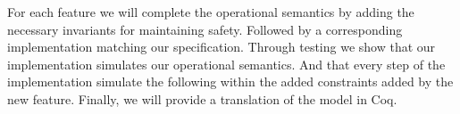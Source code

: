 \documentclass[systeme,french,english]{compas2022}
\begin{document}
For each feature we will complete the operational semantics by adding the necessary invariants for maintaining safety.
Followed by a corresponding implementation matching our specification.
Through testing we show that our implementation simulates our operational semantics.
And that every step of the implementation simulate the following within the added constraints added by the new feature.
Finally, we will provide a translation of the model in Coq.




\end{document}
